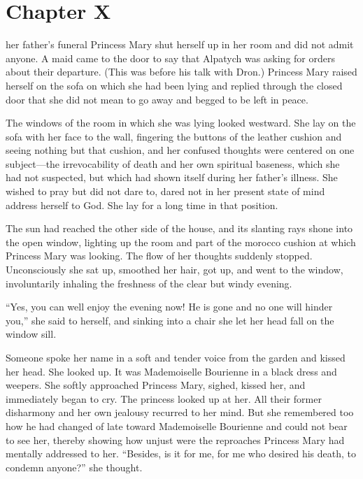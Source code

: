 \chapter*{Chapter X} \ifaudio {}
\fi

 her father's funeral Princess Mary shut herself up in her
room and did not admit anyone. A maid came to the door to say
that Alpatych was asking for orders about their departure. (This
was before his talk with Dron.) Princess Mary raised herself on
the sofa on which she had been lying and replied through the
closed door that she did not mean to go away and begged to be
left in peace.

The windows of the room in which she was lying looked
westward. She lay on the sofa with her face to the wall,
fingering the buttons of the leather cushion and seeing nothing
but that cushion, and her confused thoughts were centered on one
subject---the irrevocability of death and her own spiritual
baseness, which she had not suspected, but which had shown itself
during her father's illness. She wished to pray but did not dare
to, dared not in her present state of mind address herself to
God.  She lay for a long time in that position.

The sun had reached the other side of the house, and its slanting
rays shone into the open window, lighting up the room and part of
the morocco cushion at which Princess Mary was looking. The flow
of her thoughts suddenly stopped. Unconsciously she sat up,
smoothed her hair, got up, and went to the window, involuntarily
inhaling the freshness of the clear but windy evening.

``Yes, you can well enjoy the evening now! He is gone and no one
will hinder you,'' she said to herself, and sinking into a chair
she let her head fall on the window sill.

Someone spoke her name in a soft and tender voice from the garden
and kissed her head. She looked up. It was Mademoiselle Bourienne
in a black dress and weepers. She softly approached Princess
Mary, sighed, kissed her, and immediately began to cry. The
princess looked up at her. All their former disharmony and her
own jealousy recurred to her mind. But she remembered too how he
had changed of late toward Mademoiselle Bourienne and could not
bear to see her, thereby showing how unjust were the reproaches
Princess Mary had mentally addressed to her. ``Besides, is it for
me, for me who desired his death, to condemn anyone?'' she
thought.


